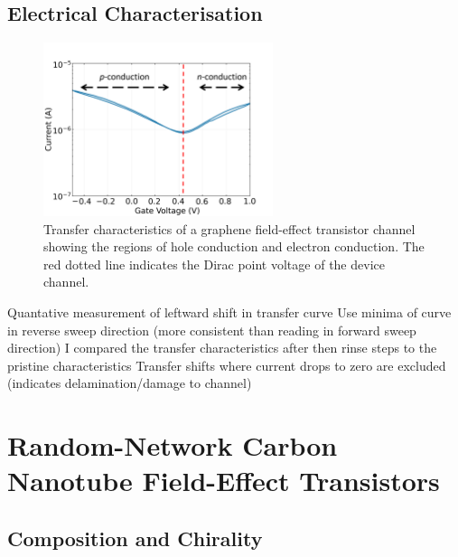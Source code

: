 \documentclass[
  a4paper,
]{scrbook}
\begin{document}
\hypertarget{sec-electrical-characterisation-graphene}{%
\subsection{Electrical
Characterisation}\label{sec-electrical-characterisation-graphene}}

\begin{figure}

{\centering \includegraphics[width=0.6\textwidth,height=\textheight]{figures/ch2/Graphene_transfer.png}

}

\caption{\label{fig-linker-raman}Transfer characteristics of a graphene
field-effect transistor channel showing the regions of hole conduction
and electron conduction. The red dotted line indicates the Dirac point
voltage of the device channel.}

\end{figure}

Quantative measurement of leftward shift in transfer curve Use minima of
curve in reverse sweep direction (more consistent than reading in
forward sweep direction) I compared the transfer characteristics after
then rinse steps to the pristine characteristics Transfer shifts where
current drops to zero are excluded (indicates delamination/damage to
channel)

\hypertarget{random-network-carbon-nanotube-field-effect-transistors}{%
\section{Random-Network Carbon Nanotube Field-Effect
Transistors}\label{random-network-carbon-nanotube-field-effect-transistors}}

\hypertarget{composition-and-chirality}{%
\subsection{Composition and Chirality}\label{composition-and-chirality}}
\end{document}
